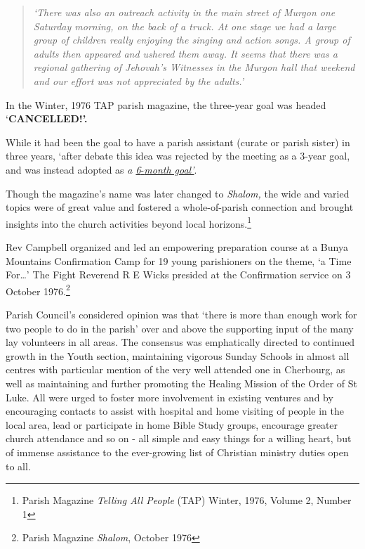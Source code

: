 \begin{quote}
\emph{`There was also an outreach activity in the main street of Murgon
one Saturday morning, on the back of a truck. At one stage we had a
large group of children really enjoying the singing and action songs. A
group of adults then appeared and ushered them away. It seems that there
was a regional gathering of Jehovah's Witnesses in the Murgon hall that
weekend and our effort was not appreciated by the adults.'}
\end{quote}

In the Winter, 1976 TAP parish magazine, the three-year goal was headed
`\textbf{CANCELLED!'.}

While it had been the goal to have a parish assistant (curate or parish
sister) in three years, `after debate this idea was rejected by the
meeting as a 3-year goal, and was instead adopted as \emph{a
\underline{6}}\underline{-\emph{month goal'}}.

Though the magazine's name was later changed to \emph{Shalom,} the wide
and varied topics were of great value and fostered a whole-of-parish
connection and brought insights into the church activities beyond local
horizons.\footnote{Parish Magazine \emph{Telling All People} (TAP)
  Winter, 1976, Volume 2, Number 1}

Rev Campbell organized and led an empowering preparation course at a
Bunya Mountains Confirmation Camp for 19 young parishioners on the
theme, `a Time For\ldots' The Fight Reverend R E Wicks presided at the
Confirmation service on 3 October 1976.\footnote{Parish Magazine
  \emph{Shalom}, October 1976}

Parish Council's considered opinion was that `there is more than enough
work for two people to do in the parish' over and above the supporting
input of the many lay volunteers in all areas. The consensus was
emphatically directed to continued growth in the Youth section,
maintaining vigorous Sunday Schools in almost all centres with
particular mention of the very well attended one in Cherbourg, as well
as maintaining and further promoting the Healing Mission of the Order of
St Luke. All were urged to foster more involvement in existing ventures
and by encouraging contacts to assist with hospital and home visiting of
people in the local area, lead or participate in home Bible Study
groups, encourage greater church attendance and so on - all simple and
easy things for a willing heart, but of immense assistance to the
ever-growing list of Christian ministry duties open to all.

